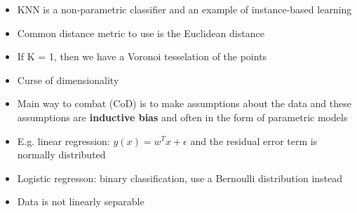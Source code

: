\documentclass[../main.tex]{subfiles}
\begin{document}
\begin{itemize}
  \item KNN is a non-parametric classifier and an example of instance-based learning
  \item Common distance metric to use is the Euclidean distance
  \item If K = 1, then we have a Voronoi tesselation of the points
  \item Curse of dimensionality
  \item Main way to combat (CoD) is to make assumptions about the data and these assumptions are \textbf{inductive bias} and often in the form of parametric models
  \item E.g. linear regression: $y(x) = w^{T}x + \epsilon$ and the residual error term is normally distributed
  \item Logistic regresson: binary classification, use a Bernoulli distribution instead
  \item Data is not linearly separable
\end{itemize}
\end{document}
